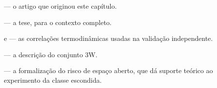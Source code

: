 \begin{leituras}
\item \citet{Lopes2026PST} --- o artigo que originou este capítulo.
\item \citet{LopesTese2025} --- a tese, para o contexto completo.
\item \citet{montie1991} e \citet{Safamirzaei2015} --- as correlações termodinâmicas
      usadas na validação independente.
\item \citet{VARGAS2019} --- a descrição do conjunto 3W.
\item \citet{Scheirer2013} --- a formalização do risco de espaço aberto, que dá suporte
      teórico ao experimento da classe escondida.
\end{leituras}
